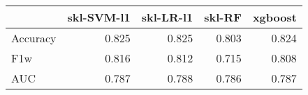 \begin{tabular}{lrrrr}
\toprule
{} &  skl-SVM-l1 &  skl-LR-l1 &  skl-RF &  xgboost \\
\midrule
Accuracy &       0.825 &      0.825 &   0.803 &    0.824 \\
F1w      &       0.816 &      0.812 &   0.715 &    0.808 \\
AUC      &       0.787 &      0.788 &   0.786 &    0.787 \\
\bottomrule
\end{tabular}
